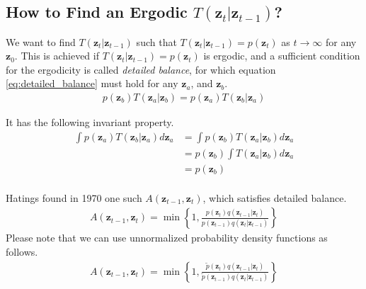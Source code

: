 \documentclass[a4]{article}
\begin{document}
\subsection{How to Find an Ergodic $T\left(\bm{z}_{t}|\bm{z}_{t-1}\right)$?}
We want to find $T\left(\bm{z}_{t}|\bm{z}_{t-1}\right)$ such that
$T\left(\bm{z}_{t}|\bm{z}_{t-1}\right)= p(\bm{z}_{t})$ as $t \rightarrow \infty$ for any $\bm{z}_0$.
This is achieved if $T\left(\bm{z}_{t}|\bm{z}_{t-1}\right)= p(\bm{z}_{t})$ is ergodic, and a sufficient
condition for the ergodicity is called \textit{detailed balance},
for which equation \ref{eq:detailed_balance} must hold for any $\bm{z}_{a}$, and $\bm{z}_{b}$.
\begin{equation}
\begin{aligned}
p(\bm{z}_b) T(\bm{z}_{a}|\bm{z}_{b}) = p(\bm{z}_a) T(\bm{z}_{b}|\bm{z}_{a})\label{eq:detailed_balance}
\end{aligned}
\end{equation}

It has the following invariant property.
\begin{equation}
\begin{aligned}
\int p(\bm{z}_a) T(\bm{z}_{b}|\bm{z}_{a}) d\bm{z}_a
&= \int p(\bm{z}_b) T(\bm{z}_{a}|\bm{z}_{b}) d\bm{z}_a\\
&= p(\bm{z}_b) \int T(\bm{z}_{a}|\bm{z}_{b}) d\bm{z}_a\\
&= p(\bm{z}_b)\\
\end{aligned}
\end{equation}

Hatings\cite{mcmc_hastings} found in 1970 one such $A\left(\bm{z}_{t-1}, \bm{z}_{t}\right)$, which satisfies detailed balance.
\begin{equation}
\begin{aligned}
A\left(\bm{z}_{t-1}, \bm{z}_{t}\right)
 = \min\left\{1, \frac{p(\bm{z}_t)q(\bm{z}_{t-1}|\bm{z}_t)}{p(\bm{z}_{t-1})q(\bm{z}_{t}|\bm{z}_{t-1})}\right\}
\label{eq:metropolis_hastings}
\end{aligned}
\end{equation}
Please note that we can use unnormalized probability density functions as follows.
\begin{equation}
\begin{aligned}
A\left(\bm{z}_{t-1}, \bm{z}_{t}\right)
 = \min\left\{1, \frac{\tilde{p}(\bm{z}_t)q(\bm{z}_{t-1}|\bm{z}_t)}{\tilde{p}(\bm{z}_{t-1})q(\bm{z}_{t}|\bm{z}_{t-1})}\right\}
\end{aligned}
\end{equation}
\end{document}
